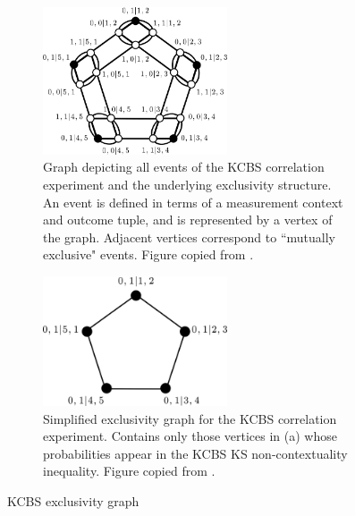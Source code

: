 \begin{figure}
\centering
\begin{subfigure}{\textwidth}
    \centering
    \includegraphics[width=0.6\textwidth]{images/kcbsexclusivity1.png}
    \caption{Graph depicting all events of the KCBS correlation experiment and the underlying exclusivity structure. An event is defined in terms of a measurement context and outcome tuple, and is represented by a vertex of the graph. Adjacent vertices correspond to ``mutually exclusive" events. Figure copied from \cite{Cabello2014}.}
\end{subfigure}
\break\vspace{5ex}
\begin{subfigure}{\textwidth}
    \centering 
    \includegraphics[width=0.6\textwidth]{images/kcbsexclusivity2.png}
    \caption{Simplified exclusivity graph for the KCBS correlation experiment. Contains only those vertices in (a) whose probabilities appear in the KCBS KS non-contextuality inequality. Figure copied from \cite{Cabello2014}.}
\end{subfigure}

\caption{KCBS exclusivity graph}
\label{fig:kcbsexclusivity}
\end{figure}


